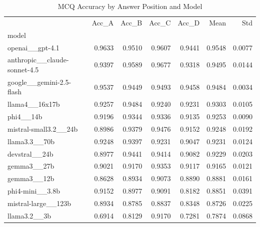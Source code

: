 \begin{table}[htbp]
\centering
\caption{MCQ Accuracy by Answer Position and Model}
\label{tab:position_accuracy}
\begin{tabular}{lrrrrrr}
\toprule
 & Acc_A & Acc_B & Acc_C & Acc_D & Mean & Std \\
model &  &  &  &  &  &  \\
\midrule
openai__gpt-4.1 & 0.9633 & 0.9510 & 0.9607 & 0.9441 & 0.9548 & 0.0077 \\
anthropic__claude-sonnet-4.5 & 0.9397 & 0.9589 & 0.9677 & 0.9318 & 0.9495 & 0.0144 \\
google__gemini-2.5-flash & 0.9537 & 0.9449 & 0.9493 & 0.9458 & 0.9484 & 0.0034 \\
llama4__16x17b & 0.9257 & 0.9484 & 0.9240 & 0.9231 & 0.9303 & 0.0105 \\
phi4__14b & 0.9196 & 0.9344 & 0.9336 & 0.9135 & 0.9253 & 0.0090 \\
mistral-small3.2__24b & 0.8986 & 0.9379 & 0.9476 & 0.9152 & 0.9248 & 0.0192 \\
llama3.3__70b & 0.9248 & 0.9397 & 0.9231 & 0.9047 & 0.9231 & 0.0124 \\
devstral__24b & 0.8977 & 0.9441 & 0.9414 & 0.9082 & 0.9229 & 0.0203 \\
gemma3__27b & 0.9021 & 0.9170 & 0.9353 & 0.9117 & 0.9165 & 0.0121 \\
gemma3__12b & 0.8628 & 0.8934 & 0.9073 & 0.8890 & 0.8881 & 0.0161 \\
phi4-mini__3.8b & 0.9152 & 0.8977 & 0.9091 & 0.8182 & 0.8851 & 0.0391 \\
mistral-large__123b & 0.8934 & 0.8785 & 0.8837 & 0.8348 & 0.8726 & 0.0225 \\
llama3.2__3b & 0.6914 & 0.8129 & 0.9170 & 0.7281 & 0.7874 & 0.0868 \\
\bottomrule
\end{tabular}

\end{table}
